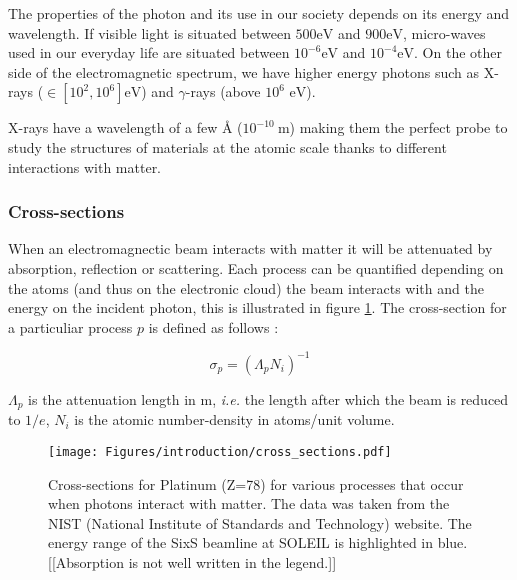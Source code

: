 The properties of the photon and its use in our society depends on its energy and wavelength.
If visible light is situated between $500 \si{\electronvolt}$ and $900 \si{\electronvolt}$, micro-waves used in our everyday life are situated between $10^{-6} \si{\electronvolt}$ and $10^{-4}\si{\electronvolt}$.
On the other side of the electromagnetic spectrum, we have higher energy photons such as X-rays ($\in [10^{2}, 10^{6}] \si{\electronvolt}$) and $\gamma$-rays (above {\color{DarkOrange}$10^{6}$} $\si{\electronvolt}$).

X-rays have a wavelength of a few \si{\angstrom} ($10^{-10} \:\si{\meter}$) making them the perfect probe to study the structures of materials at the atomic scale thanks to different interaction{\color{DarkOrange}s} with matter.

\subsubsection{Cross-sections}

When an electromagnectic beam interacts with matter it will be attenuated by absor{\color{DarkOrange}p}tion, reflection or scattering.
Each process can be quantified depending on the atoms (and thus on the electronic cloud) the beam interacts with and the energy on the incident photon, this is illustrated in figure \ref{fig:cross_sections}.
The cross-section for a particuliar process $p$ is defined as follows \parencite{Willmott}:

\begin{equation}
	\sigma_p = (\Lambda_p N_i)^{-1}
\end{equation}

$\Lambda_p$ is the attenuation length in \si{\meter}, \textit{i.e.} the length after which the beam is reduced to $1/e$, $N_i$ is the atomic number-density in atoms/unit volume.

\begin{figure}[!htb]
    \centering
    \texttt{[image: Figures/introduction/cross\_sections.pdf]}
    \caption{Cross-sections for Platinum (Z=78) for various processes that occur when photons interact with matter. The data was taken from the NIST (National Institute of Standards and Technology) \parencite{NIST_cross_sections} website. The energy range of the SixS beamline at SOLEIL is highlighted in blue. {\color{DarkOrange}[[Absorption is not well written in the legend.]]}}
    \label{fig:cross_sections}
\end{figure}

